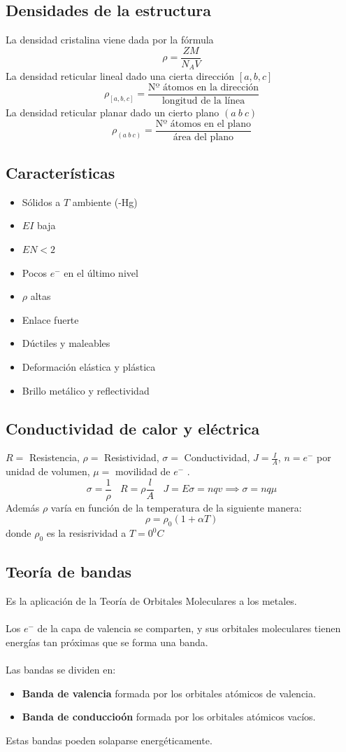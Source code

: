\documentclass[12pt]{article}
\begin{document}
	\subsection{Densidades de la estructura}
La densidad cristalina viene dada por la fórmula 
\[\rho = \frac{ZM}{N_AV}\]
La densidad reticular lineal dado una cierta dirección $[a,b,c]$ 
\[\rho_{[a,b,c]}=\frac{\text{Nº átomos en la dirección}}{\text{longitud de la línea}}\]
La densidad reticular planar dado un cierto plano $(a\ b\ c)$ 
\[\rho_{(a\ b\ c)}=\frac{\text{Nº átomos en el plano}}{\text{área del plano}}\]

	\subsection{Características}
	\begin{itemize}
		\item Sólidos a $T$ ambiente (-Hg)
		\item $EI$ baja
		\item $EN<2$
		\item Pocos $e^-$ en el último nivel
		\item $\rho$ altas
		\item Enlace fuerte
		\item Dúctiles y maleables
		\item Deformación elástica y plástica
		\item Brillo metálico y reflectividad
	\end{itemize}
	\subsection{Conductividad de calor y eléctrica}
	$R=$ Resistencia,  $\rho=$ Resistividad,  $\sigma=$ Conductividad,  $J=\frac{I}{A}$,  $n=e^-$ por unidad de volumen,  $\mu=$ movilidad de $e^-$ .
	\[\sigma=\frac{1}{\rho} \ \ \ \ R=\rho\frac{l}{A}\ \ \ \ J=E\sigma=nqv \implies \sigma=nq\mu\]
	Además $\rho$ varía en función de la temperatura de la siguiente manera:
	\[\rho=\rho_0(1+\alpha T)\]
	donde $\rho_0$ es la resisrividad a $T=0^0C$
	
	\subsection{Teoría de bandas}
	Es la aplicación de la Teoría de Orbitales Moleculares a los metales.\\ \\
	Los $e^-$ de la capa de valencia se comparten, y sus orbitales moleculares tienen energías tan próximas que se forma una banda.\\ \\
	Las bandas se dividen en:
	\begin{itemize}
		\item \textbf{Banda de valencia} formada por los orbitales atómicos de valencia.
		\item \textbf{Banda de conduccioón} formada por los orbitales atómicos vacíos.
	\end{itemize}
	Estas bandas poeden solaparse energéticamente.
	
\end{document}
